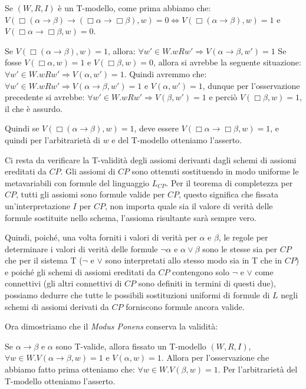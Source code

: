 \documentclass[a4paper, 12pt]{article}
\begin{document}
\begin{flushleft}
Se $(W, R, I)$ è un T-modello, come prima abbiamo che:
$V(\Box (\alpha \rightarrow \beta) \rightarrow (\Box \alpha \rightarrow \Box \beta), w) = 0
\Leftrightarrow V(\Box (\alpha \rightarrow \beta), w) = 1$ e $V(\Box \alpha \rightarrow \Box \beta, w) = 0$.

Se $V(\Box(\alpha \rightarrow \beta), w) = 1$, allora: $\forall w' \in W. wRw' \Rightarrow V(\alpha \rightarrow \beta, w') = 1$
Se fosse $V(\Box \alpha, w) = 1$ e $V(\Box \beta, w) = 0$, allora si avrebbe la seguente
situazione: $\forall w' \in W. wRw' \Rightarrow V(\alpha, w') = 1$. Quindi avremmo che:
$\forall w' \in W. wRw' \Rightarrow V(\alpha \rightarrow \beta, w') = 1$ e $V(\alpha, w') = 1$,
dunque per l'osservazione precedente si avrebbe: $\forall w' \in W. wRw' \Rightarrow V(\beta, w') = 1$
e perciò $V(\Box \beta, w) = 1$, il che è assurdo.

Quindi se $V(\Box(\alpha \rightarrow \beta), w) = 1$, deve essere $V(\Box \alpha \rightarrow \Box \beta, w) = 1$,
e quindi per l'arbitrarietà di $w$ e del T-modello otteniamo l'asserto.

Ci resta da verificare la T-validità degli assiomi derivanti dagli schemi di assiomi ereditati da $CP$.
Gli assiomi di $CP$ sono ottenuti sostituendo in modo uniforme le metavariabili con
formule del linguaggio $L_{CP}$.
Per il teorema di completezza per $CP$, tutti gli assiomi sono formule valide per $CP$,
questo significa che fissata un'interpretazione $I$ per $CP$,
non importa quale sia il valore di verità delle formule sostituite nello schema,
l'assioma risultante sarà sempre vero.

Quindi, poiché, una volta forniti i valori di verità per $\alpha$ e $\beta$,
le regole per determinare i valori di verità delle formule $\neg \alpha$ e $\alpha \lor \beta$
sono le stesse sia per $CP$ che per il sistema T
($\neg$ e $\lor$ sono interpretati allo stesso modo sia in T che in $CP$) e poiché
gli schemi di assiomi ereditati da $CP$ contengono solo $\neg$ e $\lor$ come connettivi
(gli altri connettivi di $CP$ sono definiti in termini di questi due),
possiamo dedurre che tutte le possibili sostituzioni uniformi di formule di $L$
negli schemi di assiomi derivati da $CP$ forniscono formule ancora valide.

Ora dimostriamo che il \textit{Modus Ponens} conserva la validità:

Se $\alpha \rightarrow \beta$ e $\alpha$ sono T-valide, allora fissato un T-modello $(W, R, I)$,
$\forall w \in W. V(\alpha \rightarrow \beta, w) = 1$ e $V(\alpha, w) = 1$.
Allora per l'osservazione che abbiamo fatto prima otteniamo che:
$\forall w \in W. V(\beta, w) = 1$. Per l'arbitrarietà del T-modello otteniamo l'asserto.


\end{flushleft}
\end{document}
